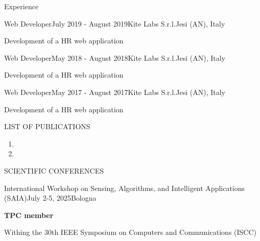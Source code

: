 \documentclass[
	11pt, %
]{resume} %
\begin{document}
\begin{rSection}{Experience}
    \begin{rSubsection}{Web Developer}{July 2019 - August 2019}{Kite Labs S.r.l.}{Jesi (AN), Italy}
	    \item Development of a HR web application
    \end{rSubsection}

    \begin{rSubsection}{Web Developer}{May 2018 - August 2018}{Kite Labs S.r.l.}{Jesi (AN), Italy}
	    \item Development of a HR web application
    \end{rSubsection}

    \begin{rSubsection}{Web Developer}{May 2017 - August 2017}{Kite Labs S.r.l.}{Jesi (AN), Italy}
	    \item Development of a HR web application
    \end{rSubsection}
\end{rSection}


\begin{rSection}{LIST OF PUBLICATIONS}
    \begin{enumerate}
        \item {}
        \item {}
    \end{enumerate} 
\end{rSection}


\begin{rSection}{SCIENTIFIC CONFERENCES}
    \begin{rSubsection}{International Workshop on Sensing, Algorithms, and Intelligent Applications (SAIA)}{July 2-5, 2025}{Bologna}{}
        \item \textbf{TPC member}
        \item Withing the 30th IEEE Symposium on Computers and Communications (ISCC)
    \end{rSubsection}
\end{rSection}
\end{document}
